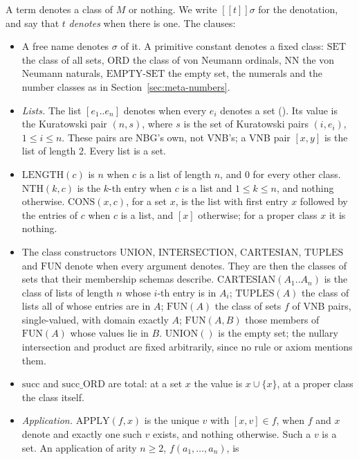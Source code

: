 A term denotes a class of $M$ or nothing.  We write $[\![t]\!]\sigma$
for the denotation, and say that $t$ \emph{denotes} when there is one.
The clauses:
\begin{itemize}
\item A free name denotes $\sigma$ of it.  A primitive constant denotes
  a fixed class: $\mathrm{SET}$ the class of all sets, $\mathrm{ORD}$
  the class of von Neumann ordinals, $\mathrm{NN}$ the von Neumann
  naturals, $\mathrm{EMPTY\text{-}SET}$ the empty set, the numerals and
  the number classes as in Section~\ref{sec:meta-numbers}.
\item \emph{Lists.}  The list $[e_1..e_n]$ denotes when every $e_i$
  denotes a set ().  Its value is the Kuratowski pair
  $(n, s)$, where $s$ is the set of Kuratowski pairs $(i, e_i)$,
  $1\leq i\leq n$.  These pairs are NBG's own, not VNB's; a VNB pair
  $[x, y]$ is the list of length 2.  Every list is a set.
\item $\mathrm{LENGTH}(c)$ is $n$ when $c$ is a list of length $n$, and
  $0$ for every other class.  $\mathrm{NTH}(k, c)$ is the $k$-th entry
  when $c$ is a list and $1\leq k\leq n$, and nothing otherwise.
  $\mathrm{CONS}(x, c)$, for a set $x$, is the list with first entry $x$
  followed by the entries of $c$ when $c$ is a list, and $[x]$
  otherwise; for a proper class $x$ it is nothing.
\item The class constructors $\mathrm{UNION}$, $\mathrm{INTERSECTION}$,
  $\mathrm{CARTESIAN}$, $\mathrm{TUPLES}$ and $\mathrm{FUN}$ denote
  when every argument denotes.  They are then the classes of sets that
  their membership schemas describe.  $\mathrm{CARTESIAN}(A_1..A_n)$ is the class of lists of
  length $n$ whose $i$-th entry is in $A_i$; $\mathrm{TUPLES}(A)$ the
  class of lists all of whose entries are in $A$; $\mathrm{FUN}(A)$ the
  class of sets $f$ of VNB pairs, single-valued, with domain exactly
  $A$; $\mathrm{FUN}(A, B)$ those members of $\mathrm{FUN}(A)$ whose
  values lie in $B$.  $\mathrm{UNION}()$ is the empty set; the nullary
  intersection and product are fixed arbitrarily, since no rule or
  axiom mentions them.
\item $\mathrm{succ}$ and $\mathrm{succ\_ORD}$ are total: at a set $x$
  the value is $x\cup\{x\}$, at a proper class the class itself.
\item \emph{Application.}  $\mathrm{APPLY}(f, x)$ is the unique $v$ with
  $[x, v]\in f$, when $f$ and $x$ denote and exactly one such $v$
  exists, and nothing otherwise.  Such a $v$ is a set.  An application
  of arity $n\geq 2$, $f(a_1,\ldots,a_n)$, is

\end{itemize}
